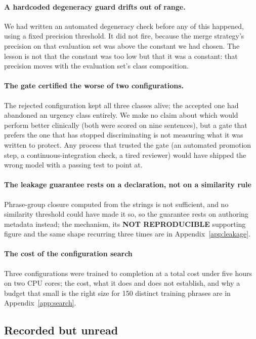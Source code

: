 \paragraph{A hardcoded degeneracy guard drifts out of range.} We had written an
automated degeneracy check before any of this happened, using a fixed precision
threshold. It did not fire, because the merge strategy's precision on that
evaluation set was above the constant we had chosen. The lesson is not that the
constant was too low but that it was a constant: that precision moves with the
evaluation set's class composition.

\paragraph{The gate certified the worse of two configurations.} The rejected
configuration kept all three classes alive; the accepted one had abandoned an
urgency class entirely. We make no claim about which would perform better
clinically (both were scored on nine sentences), but a gate that prefers the
one that has stopped discriminating is not measuring what it was written to
protect. Any process that trusted the gate (an automated
promotion step, a continuous-integration check, a tired reviewer) would have
shipped the wrong model with a passing test to point at.

\paragraph{The leakage guarantee rests on a declaration, not on a similarity
rule}
\label{sec:disc:leakage}

Phrase-group closure computed from the strings is not sufficient, and no
similarity threshold could have made it so, so the guarantee rests on authoring
metadata instead; the mechanism, its \textbf{NOT REPRODUCIBLE} supporting figure
and the same shape recurring three times are in Appendix~\ref{app:leakage}.

\paragraph{The cost of the configuration search}

Three configurations were trained to completion at a total cost under five hours
on two CPU cores; the cost, what it does and does not establish, and why a budget
that small is the right size for 150 distinct training phrases are in
Appendix~\ref{app:search}.
\subsection{Recorded but unread}
\label{sec:disc:unread}

